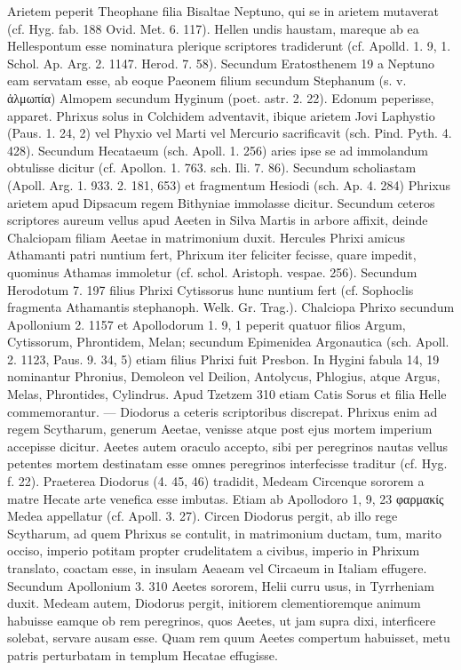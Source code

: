 \documentclass[a4paper, 11pt, oneside, polutonikogreek, german]{article}
\begin{document}
Arietem peperit Theophane filia Bisaltae Neptuno, qui se in arietem mutaverat (cf. Hyg. fab. 188 Ovid. Met. 6. 117). Hellen undis haustam, mareque ab ea Hellespontum esse nominatura plerique scriptores tradiderunt (cf. Apolld. 1. 9, 1. Schol. Ap. Arg. 2. 1147. Herod. 7. 58). Secundum Eratosthenem 19 a Neptuno eam servatam esse, ab eoque Paeonem filium secundum Stephanum (s. v. ἀλμωπία) Almopem secundum Hyginum (poet. astr. 2. 22). Edonum peperisse, apparet. Phrixus solus in Colchidem adventavit, ibique arietem Jovi Laphystio (Paus. 1. 24, 2) vel Phyxio vel Marti vel Mercurio sacrificavit (sch. Pind. Pyth. 4. 428). Secundum Hecataeum (sch. Apoll. 1. 256) aries ipse se ad immolandum obtulisse dicitur (cf. Apollon. 1. 763. sch. Ili. 7. 86). Secundum scholiastam (Apoll. Arg. 1. 933. 2. 181, 653) et fragmentum Hesiodi (sch. Ap. 4. 284) Phrixus arietem apud Dipsacum regem Bithyniae immolasse dicitur. Secundum ceteros scriptores aureum vellus apud Aeeten in Silva Martis in arbore affixit, deinde Chalciopam filiam Aeetae in matrimonium duxit. Hercules Phrixi amicus Athamanti patri nuntium fert, Phrixum iter feliciter fecisse, quare impedit, quominus Athamas immoletur (cf. schol. Aristoph. vespae. 256). Secundum Herodotum 7. 197 filius Phrixi Cytissorus hunc nuntium fert (cf. Sophoclis fragmenta Athamantis stephanoph. Welk. Gr. Trag.). Chalciopa Phrixo secundum Apollonium 2. 1157 et Apollodorum 1. 9, 1 peperit quatuor filios Argum, Cytissorum, Phrontidem, Melan; secundum Epimenidea Argonautica (sch. Apoll. 2. 1123, Paus. 9. 34, 5) etiam filius Phrixi fuit Presbon. In Hygini fabula 14, 19 nominantur Phronius, Demoleon vel Deilion, Antolycus, Phlogius, atque Argus, Melas, Phrontides, Cylindrus. Apud Tzetzem 310 etiam Catis Sorus et filia Helle commemorantur. --- Diodorus a ceteris scriptoribus discrepat. Phrixus enim ad regem Scytharum, generum Aeetae, venisse atque post ejus mortem imperium accepisse dicitur. Aeetes autem oraculo accepto, sibi per peregrinos nautas vellus petentes mortem destinatam esse omnes peregrinos interfecisse traditur (cf. Hyg. f. 22). Praeterea Diodorus (4. 45, 46) tradidit, Medeam Circenque sororem a matre Hecate arte venefica esse imbutas. Etiam ab Apollodoro 1, 9, 23 φαρμακίς Medea appellatur (cf. Apoll. 3. 27). Circen Diodorus pergit, ab illo rege Scytharum, ad quem Phrixus se contulit, in matrimonium ductam, tum, marito occiso, imperio potitam propter crudelitatem a civibus, imperio in Phrixum translato, coactam esse, in insulam Aeaeam vel Circaeum in Italiam effugere. Secundum Apollonium 3. 310 Aeetes sororem, Helii curru usus, in Tyrrheniam duxit. Medeam autem, Diodorus pergit, initiorem clementioremque animum habuisse eamque ob rem peregrinos, quos Aeetes, ut jam supra dixi, interficere solebat, servare ausam esse. Quam rem quum Aeetes compertum habuisset, metu patris perturbatam in templum Hecatae effugisse.
\end{document}
